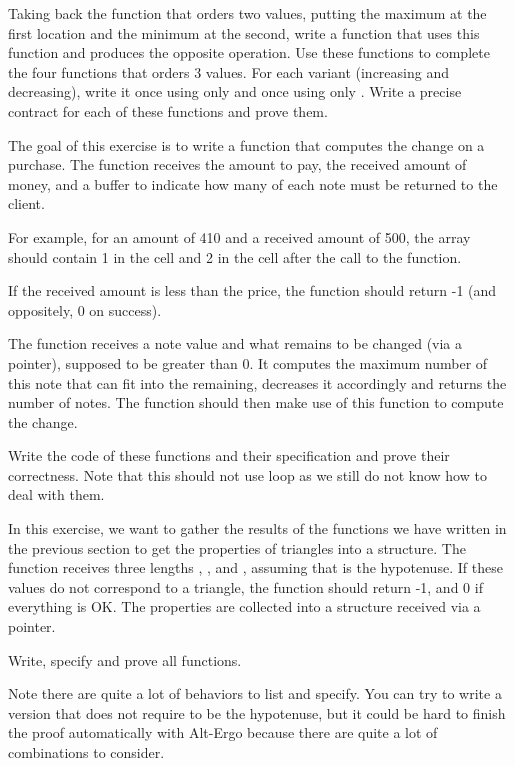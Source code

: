 \label{l4:contract-modularity-ex-order-3}


Taking back the function  that orders two values,
putting the maximum at the first location and the minimum at the second,
write a function  that uses this function and
produces the opposite operation. Use these functions to complete the
four functions that orders 3 values. For each variant (increasing and
decreasing), write it once using only  and once
using only . Write a precise contract for each of
these functions and prove them.







The goal of this exercise is to write a function that computes the change
on a purchase. The function  receives the amount
to pay, the received amount of money, and a buffer to indicate how
many of each note must be returned to the client.


For example, for an amount of 410 and a received amount of 500, the array
should contain 1 in the cell  and 2 in the cell
 after the call to the function.


If the received amount is less than the price, the function should
return -1 (and oppositely, 0 on success).




The function  receives a note value and
what remains to be changed (via a pointer), supposed to be greater than
0. It computes the maximum number of this note that can fit into the
remaining, decreases it accordingly and returns the number of notes.
The function  should then make use of this function
to compute the change.


Write the code of these functions and their specification and prove their
correctness. Note that this should not use loop as we still do not know
how to deal with them.




In this exercise, we want to gather the results of the functions we have
written in the previous section to get the properties of triangles into
a structure. The function  receives three lengths
, , and , assuming that
 is the hypotenuse. If these values do not correspond to a
triangle, the function should return -1, and 0 if everything is OK. The
properties are collected into a structure  received via
a pointer.




Write, specify and prove all functions.


Note there are quite a lot of behaviors to list and specify. You can try
to write a version that does not require  to be the hypotenuse,
but it could be hard to finish the proof automatically with
Alt-Ergo because there are quite a lot of combinations to consider.
